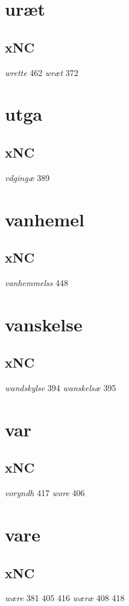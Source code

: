 \documentclass[a4paper,twocolumn]{article}
\begin{document}
\section{uræt}
\label{sec:orgbd00df1}
\subsection{xNC}
\label{sec:org7609a57}
\emph{wrette} 462 \emph{wræt} 372 
\section{utga}
\label{sec:org006cd83}
\subsection{xNC}
\label{sec:orgb85fd87}
\emph{vdgingæ} 389 
\section{vanhemel}
\label{sec:orga8fa024}
\subsection{xNC}
\label{sec:orgd98e587}
\emph{vanhemmelss} 448 
\section{vanskelse}
\label{sec:org8add563}
\subsection{xNC}
\label{sec:org62ce1a8}
\emph{wandskylse} 394 \emph{wanskelsæ} 395 
\section{var}
\label{sec:org9b2655c}
\subsection{xNC}
\label{sec:orgdbde9c6}
\emph{voryndh} 417 \emph{wore} 406 
\section{vare}
\label{sec:org4c59155}
\subsection{xNC}
\label{sec:org2cbdc66}
\emph{wære} 381 405 416 \emph{wæræ} 408 418 
\end{document}
